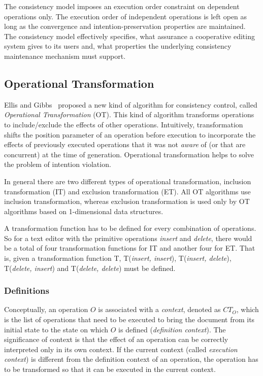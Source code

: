\documentclass[11pt,a4paper]{article}
\begin{document}
The consistency model imposes an execution order constraint on dependent operations only. The execution order of independent operations is left open as long as the convergence and intention-preservation properties are maintained. The consistency model effectively specifies, what assurance a cooperative editing system gives to its users and, what properties the underlying consistency maintenance mechanism must support.



\subsection{Operational Transformation}
\label{sect:ot}
{Ellis and Gibbs}~\cite{ellis} proposed a new kind of algorithm for consistency control, called \emph{Operational Transformation} (OT).  This kind of algorithm transforms operations to include/exclude the effects of other operations. Intuitively, transformation shifts the position parameter of an operation before execution to incorporate the effects of previously executed operations that it was not \emph{aware} of (or that are concurrent) at the time of generation. Operational transformation helps to solve the problem of intention violation.

In general there are two different types of operational transformation, inclusion transformation (IT) and exclusion transformation (ET). All OT algorithms use inclusion transformation, whereas exclusion transformation is used only by OT algorithms based on 1-dimensional data structures.

A transformation function has to be defined for every combination of operations. So for a text editor with the primitive operations \emph{insert} and \emph{delete}, there would be a total of four transformation functions for IT and another four for ET. That is, given a transformation function T, T(\emph{insert, insert}), T(\emph{insert, delete}), T(\emph{delete, insert}) and T(\emph{delete, delete}) must be defined.

\subsubsection{Definitions}
\label{definitions}
Conceptually, an operation $O$ is associated with a \emph{context}, denoted as $CT_{O}$, which is the list of operations that need to be executed to bring the document from its initial state to the state on which $O$ is defined (\emph{definition context}). The significance of context is that the effect of an operation can be correctly interpreted only in its own context. If the current context (called \emph{execution context}) is different from the definition context of an operation, the operation has to be transformed so that it can be executed in the current context.
\end{document}
